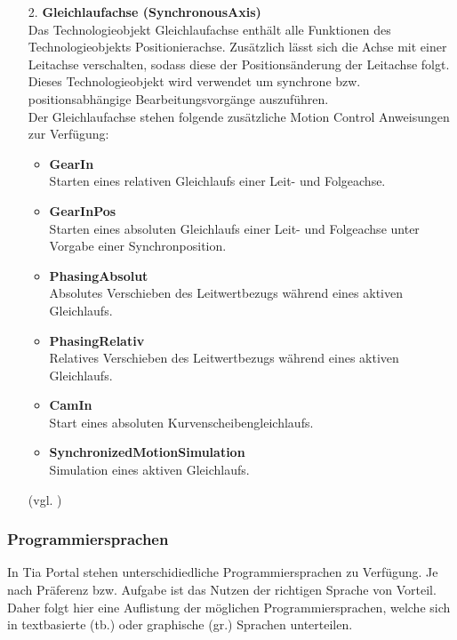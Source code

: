 \begin{itemize}
        \item[2.] \textbf{Gleichlaufachse (SynchronousAxis)} \\
            Das Technologieobjekt Gleichlaufachse enthält alle Funktionen des Technologieobjekts Positionierachse. Zusätzlich lässt sich die Achse mit einer Leitachse verschalten, sodass diese der Positionsänderung der Leitachse folgt. Dieses Technologieobjekt wird verwendet um synchrone bzw. positionsabhängige Bearbeitungsvorgänge auszuführen. \\
            Der Gleichlaufachse stehen folgende zusätzliche Motion Control Anweisungen zur Verfügung:
            \begin{itemize}
                \item \textbf{GearIn} \\
                    Starten eines relativen Gleichlaufs einer Leit- und Folgeachse.
                \item \textbf{GearInPos} \\
                    Starten eines absoluten Gleichlaufs einer Leit- und Folgeachse unter Vorgabe einer Synchronposition.
                \item \textbf{PhasingAbsolut} \\
                    Absolutes Verschieben des Leitwertbezugs während eines aktiven Gleichlaufs.
                \item \textbf{PhasingRelativ} \\
                    Relatives Verschieben des Leitwertbezugs während eines aktiven Gleichlaufs.
                \item \textbf{CamIn} \\
                    Start eines absoluten Kurvenscheibengleichlaufs.
                \item \textbf{SynchronizedMotionSimulation} \\
                    Simulation eines aktiven Gleichlaufs. 
            \end{itemize}
             (vgl. \cite{Technologieobjekte})
    \end{itemize}

    \subsubsection{Programmiersprachen}
    In Tia Portal stehen unterschidiedliche Programmiersprachen zu Verfügung. Je nach Präferenz bzw. Aufgabe ist das Nutzen der richtigen Sprache von Vorteil. Daher folgt hier eine Auflistung der möglichen Programmiersprachen, welche sich in textbasierte (tb.) oder graphische (gr.) Sprachen unterteilen. 

